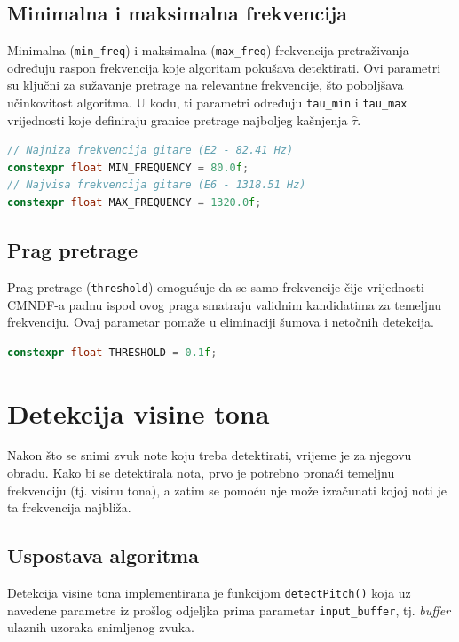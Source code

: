 \documentclass[times, utf8, diplomski, numeric]{fer}
\begin{document}
\subsection{Minimalna i maksimalna frekvencija}
%
Minimalna (\lstinline[basicstyle=\ttfamily]|min_freq|) i maksimalna (\lstinline[basicstyle=\ttfamily]|max_freq|) frekvencija pretraživanja određuju raspon frekvencija koje algoritam pokušava detektirati. Ovi parametri su ključni za sužavanje pretrage na relevantne frekvencije, što poboljšava učinkovitost algoritma. U kodu, ti parametri određuju \lstinline[basicstyle=\ttfamily]|tau_min| i \lstinline[basicstyle=\ttfamily]|tau_max| vrijednosti koje definiraju granice pretrage najboljeg kašnjenja $\hat{\tau}$.
\begin{lstlisting}[language=C++, frame=single]
// Najniza frekvencija gitare (E2 - 82.41 Hz)
constexpr float MIN_FREQUENCY = 80.0f;
// Najvisa frekvencija gitare (E6 - 1318.51 Hz)
constexpr float MAX_FREQUENCY = 1320.0f;
\end{lstlisting}

\subsection{Prag pretrage}
%
Prag pretrage (\lstinline[basicstyle=\ttfamily]|threshold|) omogućuje da se samo frekvencije čije vrijednosti CMNDF-a padnu ispod ovog praga smatraju validnim kandidatima za temeljnu frekvenciju. Ovaj parametar pomaže u eliminaciji šumova i netočnih detekcija.
\begin{lstlisting}[language=C++, frame=single]
constexpr float THRESHOLD = 0.1f;
\end{lstlisting}

\section{Detekcija visine tona}
%
Nakon što se snimi zvuk note koju treba detektirati, vrijeme je za njegovu obradu. Kako bi se detektirala nota, prvo je potrebno pronaći temeljnu frekvenciju (tj. visinu tona), a zatim se pomoću nje može izračunati kojoj noti je ta frekvencija najbliža.

\subsection{Uspostava algoritma}
%
Detekcija visine tona implementirana je funkcijom \lstinline[basicstyle=\ttfamily]|detectPitch()| koja uz navedene parametre iz prošlog odjeljka prima parametar \lstinline[basicstyle=\ttfamily]|input_buffer|, tj. \textit{buffer} ulaznih uzoraka snimljenog zvuka.
\end{document}
